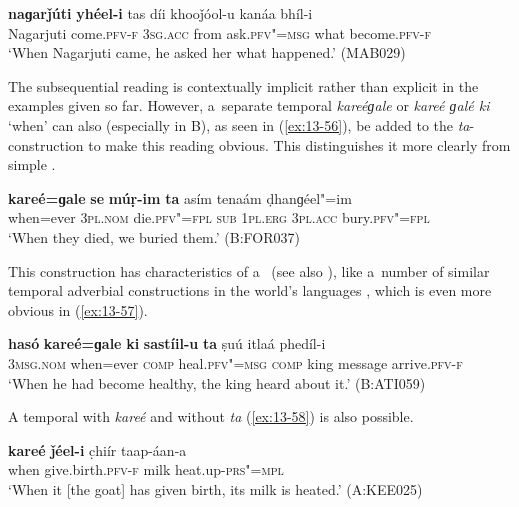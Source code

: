 \begin{exe}
\ex
\label{ex:13-55}
\gll \textbf{naɡarǰúti} \textbf{yhéel-i} tas díi khooǰóol-u kanáa bhíl-i \\
Nagarjuti come.\textsc{pfv-f} \textsc{3sg.acc} from ask.\textsc{pfv"=msg}  what become.\textsc{pfv-f} \\
\glt `When Nagarjuti came, he asked her what happened.' (MAB029) 
\end{exe}

The subsequential reading is contextually implicit rather than explicit in the examples given so far. However, a~separate temporal  \textit{kareéɡale} or \textit{kareé ɡalé ki} `when' can also (especially in B), as seen in (\ref{ex:13-56}), be added to the \textit{ta}-construction to make this reading obvious. This distinguishes it more clearly from simple .

\begin{exe}
\ex
\label{ex:13-56}
\gll \textbf{kareé=ɡale} \textbf{se} \textbf{múṛ-im} \textbf{ta} asím tenaám ḍhanɡéel"=im \\
when=ever \textsc{3pl.nom} die.\textsc{pfv"=fpl} \textsc{sub} \textsc{1pl.erg} \textsc{3pl.acc} bury.\textsc{pfv"=fpl} \\
\glt `When they died, we buried them.' (B:FOR037) 
\end{exe}

This construction has characteristics of a~ (see also ), like a~number of similar temporal adverbial constructions in the world's languages \citep[246--247]{thompsonetal2007}, which is even more obvious in (\ref{ex:13-57}).

\begin{exe}
\ex
\label{ex:13-57}
\gll \textbf{hasó} \textbf{kareé=ɡale} \textbf{ki} \textbf{sastíil-u} \textbf{ta} ṣuú itlaá phedíl-i\\
\textsc{3msg.nom} when=ever \textsc{comp} heal.\textsc{pfv"=msg} \textsc{comp} king message arrive.\textsc{pfv-f}\\
\glt `When he had become healthy, the king heard about it.' (B:ATI059) 
\end{exe}

A  temporal  with \textit{kareé} and without \textit{ta} (\ref{ex:13-58}) is also possible.

\begin{exe}
\ex
\label{ex:13-58}
\gll \textbf{kareé} \textbf{ǰéel-i} c̣hiír taap-áan-a \\
when give.birth.\textsc{pfv-f} milk heat.up-\textsc{prs"=mpl} \\
\glt `When it [the goat] has given birth, its milk is heated.' (A:KEE025) 
\end{exe}

